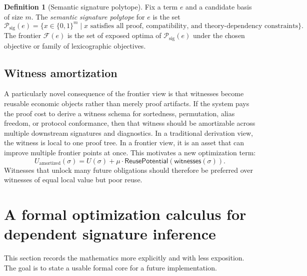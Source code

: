 \documentclass[11pt]{article}
\theoremstyle{definition}
\newtheorem{definition}{Definition}[section]
\theoremstyle{plain}
\begin{document}
\begin{definition}[Semantic signature polytope]
Fix a term $e$ and a candidate basis of size $m$. The \emph{semantic signature
polytope} for $e$ is the set
\[
\mathcal{P}_{\mathrm{sig}}(e) = \{x \in \{0,1\}^m \mid x \text{ satisfies all
proof, compatibility, and theory-dependency constraints}\}.
\]
The frontier $\mathcal{F}(e)$ is the set of exposed optima of
$\mathcal{P}_{\mathrm{sig}}(e)$ under the chosen objective or family of
lexicographic objectives.
\end{definition}

\subsection{Witness amortization}
A particularly novel consequence of the frontier view is that witnesses become
reusable economic objects rather than merely proof artifacts. If the system pays
the proof cost to derive a witness schema for sortedness, permutation, alias
freedom, or protocol conformance, then that witness should be amortizable across
multiple downstream signatures and diagnostics. In a traditional derivation
view, the witness is local to one proof tree. In a frontier view, it is an
asset that can improve multiple frontier points at once. This motivates a new
optimization term:
\[
U_{\mathrm{amortized}}(\sigma) = U(\sigma) + \mu \cdot
\mathsf{ReusePotential}(\mathsf{witnesses}(\sigma)).
\]
Witnesses that unlock many future obligations should therefore be preferred over
witnesses of equal local value but poor reuse.


\section{A formal optimization calculus for dependent signature inference}

This section records the mathematics more explicitly and with less exposition.
The goal is to state a usable formal core for a future implementation.
\end{document}

